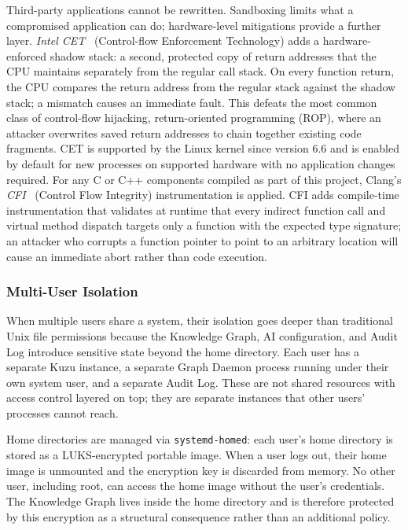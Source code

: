 Third-party applications cannot be rewritten. Sandboxing limits what a
compromised application can do; hardware-level mitigations provide a further
layer. \emph{Intel CET}~\cite{intel:cet} (Control-flow Enforcement Technology)
adds a hardware-enforced shadow stack: a second, protected copy of return
addresses that the CPU maintains separately from the regular call stack. On
every function return, the CPU compares the return address from the regular
stack against the shadow stack; a mismatch causes an immediate fault. This
defeats the most common class of control-flow hijacking, return-oriented
programming (ROP), where an attacker overwrites saved return addresses to chain
together existing code fragments. CET is supported by the Linux kernel since
version 6.6 and is enabled by default for new processes on supported hardware
with no application changes required. For any C or C++ components compiled as part of this project,
Clang's \emph{CFI}~\cite{clang:cfi} (Control Flow Integrity) instrumentation
is applied. CFI adds compile-time instrumentation that validates at runtime
that every indirect function call and virtual method dispatch targets only a
function with the expected type signature; an attacker who corrupts a function
pointer to point to an arbitrary location will cause an immediate abort rather
than code execution.

\subsubsection{Multi-User Isolation}
\label{sec:multiuser}

When multiple users share a system, their isolation goes deeper than
traditional Unix file permissions because the Knowledge Graph, AI
configuration, and Audit Log introduce sensitive state beyond the home
directory. Each user has a separate Kuzu instance, a separate Graph Daemon
process running under their own system user, and a separate Audit Log. These
are not shared resources with access control layered on top; they are
separate instances that other users' processes cannot reach.

Home directories are managed via \texttt{systemd-homed}: each user's home
directory is stored as a LUKS-encrypted portable image. When a user logs out,
their home image is unmounted and the encryption key is discarded from memory.
No other user, including root, can access the home image without the user's
credentials. The Knowledge Graph lives inside the home directory and is
therefore protected by this encryption as a structural consequence rather than
an additional policy.

